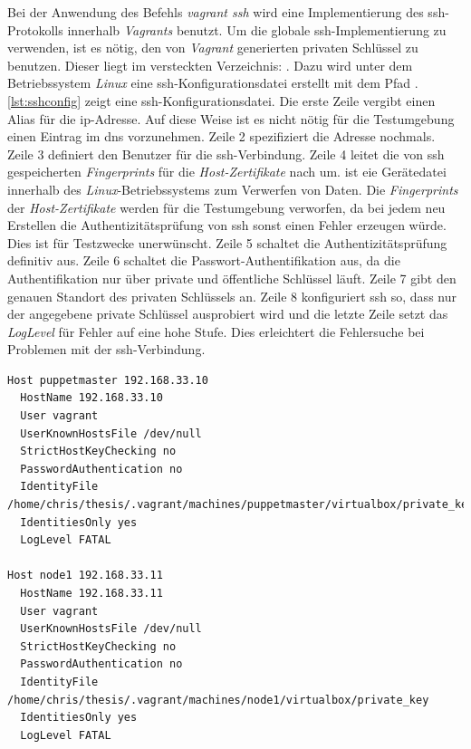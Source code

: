 \documentclass[titlepage]{report}
\begin{document}
Bei der Anwendung des Befehls \emph{vagrant ssh} wird eine
Implementierung des \gls{ssh}\hyp{}Protokolls innerhalb \emph{Vagrants} benutzt. Um
die globale \gls{ssh}\hyp{}Implementierung zu verwenden, ist es nötig, den
von \emph{Vagrant} generierten privaten Schlüssel zu benutzen. Dieser
liegt im versteckten Verzeichnis: . Dazu wird unter dem Betriebssystem
\emph{Linux} eine \gls{ssh}\hyp{}Konfigurationsdatei erstellt mit dem Pfad
. \autoref{lst:sshconfig} zeigt
eine \gls{ssh}\hyp{}Konfigurationsdatei. Die erste Zeile vergibt einen
Alias für die \gls{ip}\hyp{}Adresse. Auf diese Weise ist es nicht nötig
für die Testumgebung einen Eintrag im \gls{dns} vorzunehmen. Zeile 2
spezifiziert die Adresse nochmals. Zeile 3 definiert den Benutzer für
die \gls{ssh}\hyp{}Verbindung. Zeile 4 leitet die von \gls{ssh}
gespeicherten \emph{Fingerprints} für die \emph{Host-Zertifikate} nach
 um.  ist eie Gerätedatei innerhalb des
\emph{Linux}\hyp{}Betriebssystems zum Verwerfen von Daten\cite{DEVNULL}. Die
\emph{Fingerprints} der \emph{Host-Zertifikate} werden für die
Testumgebung verworfen, da bei jedem neu Erstellen die
Authentizitätsprüfung von \gls{ssh} sonst einen Fehler erzeugen würde.
Dies ist für Testzwecke unerwünscht. Zeile 5 schaltet die
Authentizitätsprüfung definitiv aus. Zeile 6 schaltet die
Passwort\hyp{}Authentifikation aus, da die Authentifikation nur über
private und öffentliche Schlüssel läuft. Zeile 7 gibt den
genauen Standort des privaten Schlüssels an. Zeile 8 konfiguriert
\gls{ssh} so, dass nur der angegebene private Schlüssel ausprobiert
wird und die letzte Zeile setzt das \emph{LogLevel} für Fehler auf eine
hohe Stufe. Dies erleichtert die Fehlersuche bei Problemen mit der
\gls{ssh}\hyp{}Verbindung.
\begin{minipage}{\linewidth}
\begin{lstlisting}[caption={Beispiel einer SSH Konfigurationsdatei},label={lst:sshconfig}]
Host puppetmaster 192.168.33.10
  HostName 192.168.33.10
  User vagrant
  UserKnownHostsFile /dev/null
  StrictHostKeyChecking no
  PasswordAuthentication no
  IdentityFile /home/chris/thesis/.vagrant/machines/puppetmaster/virtualbox/private_key
  IdentitiesOnly yes
  LogLevel FATAL

Host node1 192.168.33.11
  HostName 192.168.33.11
  User vagrant
  UserKnownHostsFile /dev/null
  StrictHostKeyChecking no
  PasswordAuthentication no
  IdentityFile /home/chris/thesis/.vagrant/machines/node1/virtualbox/private_key
  IdentitiesOnly yes
  LogLevel FATAL
\end{lstlisting}
\end{minipage}
\end{document}
